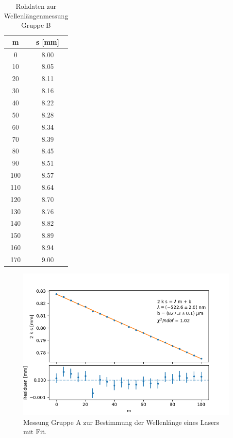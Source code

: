 \documentclass[12pt,a4paper]{article}
\begin{document}
\begin{table}
\begin{minipage}{0.5\textwidth}
		\centering
		\begin{tabular}{|c|c|}
			\hline
			m & s [mm] \\
			\hline
			0 & 8.00 \\
			\hline
			10 & 8.05 \\
			\hline
			20 & 8.11 \\
			\hline
			30 & 8.16 \\
			\hline
			40 & 8.22 \\
			\hline
			50 & 8.28 \\
			\hline
			60 & 8.34 \\
			\hline
			70 & 8.39 \\
			\hline
			80 & 8.45 \\
			\hline
			90 & 8.51 \\
			\hline
			100 & 8.57 \\
			\hline
			110 & 8.64 \\
			\hline
			120 & 8.70 \\
			\hline
			130 & 8.76 \\
			\hline
			140 & 8.82 \\
			\hline
			150 & 8.89 \\
			\hline
			160 & 8.94 \\
			\hline
			170 & 9.00 \\
			\hline
		\end{tabular}
		\caption{Rohdaten zur Wellenlängenmessung Gruppe B}
		\label{tab:laser_B}
	\end{minipage}
\end{table}

\begin{figure}
	\centering
	\includegraphics[scale=0.8]{Bilder/Laser_A.png}
	\caption{Messung Gruppe A zur Bestimmung der Wellenlänge eines Lasers mit Fit.}
	\label{fig:fit_wellenlaenge_A}
\end{figure}
\end{document}

